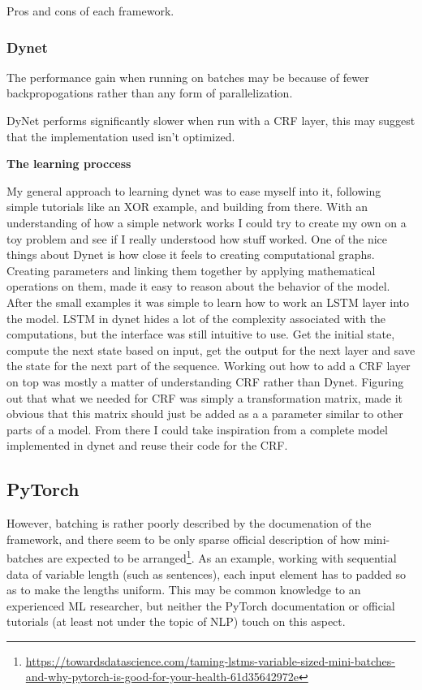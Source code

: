 Pros and cons of each framework.

\subsubsection{Dynet}

The performance gain when running on batches may be because of fewer
backpropogations rather than any form of parallelization.

DyNet performs significantly slower when run with a CRF layer, this may suggest
that the implementation used isn't optimized. 



\textbf{The learning proccess}

My general approach to learning dynet was to ease myself into it, following
simple tutorials like an XOR example, and building from there. With an
understanding of how a simple network works I could try to create my own on a
toy problem and see if I really understood how stuff worked. One of the nice
things about Dynet is how close it feels to creating computational graphs.
Creating parameters and linking them together by applying mathematical
operations on them, made it easy to reason about the behavior of the model.
After the small examples it was simple to learn how to work an LSTM layer into
the model. LSTM in dynet hides a lot of the complexity associated with the
computations, but the interface was still intuitive to use. Get the initial
state, compute the next state based on input, get the output for the next layer
and save the state for the next part of the sequence. Working out how to add a
CRF layer on top was mostly a matter of understanding CRF rather than Dynet.
Figuring out that what we needed for CRF was simply a transformation matrix,
made it obvious that this matrix should just be added as a a parameter similar
to other parts of a model. From there I could take inspiration from a complete
model implemented in dynet and reuse their code for the CRF.

\subsection{PyTorch}

However, batching is rather poorly described by the documenation of the
framework, and there seem to be only sparse official description of how
mini-batches are expected to be arranged\footnote{\url{https://towardsdatascience.com/taming-lstms-variable-sized-mini-batches-and-why-pytorch-is-good-for-your-health-61d35642972e}}.
As an example, working with sequential data of variable length (such as
sentences), each input element has to padded so as to make the lengths uniform.
This may be common knowledge to an experienced ML researcher, but neither the
PyTorch documentation or official tutorials (at least not under the topic of
NLP) touch on this aspect.

